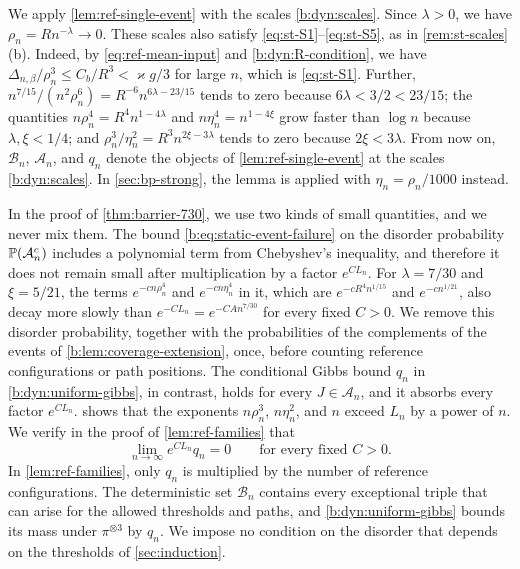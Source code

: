 We apply \cref{lem:ref-single-event} with the scales \eqref{b:dyn:scales}.
Since $\lambda>0$, we have $\rho_n=Rn^{-\lambda}\to0$. These scales also satisfy
\eqref{eq:st-S1}--\eqref{eq:st-S5}, as in
\cref{rem:st-scales}(b). Indeed, by \eqref{eq:ref-mean-input} and
\eqref{b:dyn:R-condition}, we have
$\Delta_{n,\beta}/\rho_n^3\le C_b/R^3<\varkappa g/3$ for large $n$, which is
\eqref{eq:st-S1}. Further, $n^{7/15}/(n^2\rho_n^6)=R^{-6}n^{6\lambda-23/15}$
tends to zero because $6\lambda<3/2<23/15$; the quantities
$n\rho_n^4=R^4n^{1-4\lambda}$ and $n\eta_n^4=n^{1-4\xi}$ grow faster than
$\log n$ because $\lambda,\xi<1/4$; and $\rho_n^3/\eta_n^2=R^3n^{2\xi-3\lambda}$
tends to zero because $2\xi<3\lambda$. From now on, $\mathcal B_n$,
$\mathcal A_n$, and $q_n$ denote the objects of \cref{lem:ref-single-event} at
the scales \eqref{b:dyn:scales}. In \cref{sec:bp-strong}, the lemma is
applied with $\eta_n=\rho_n/1000$ instead.

\begin{remark}\label{rem:ref-two-errors}
In the proof of \cref{thm:barrier-730}, we use two kinds of
small quantities, and we never mix them. The bound
\eqref{b:eq:static-event-failure} on the disorder probability
$\mathbb P(\mathcal A_n^c)$ includes a polynomial term from Chebyshev's inequality,
and therefore it does not remain small after multiplication by a factor
$e^{CL_n}$. For $\lambda=7/30$ and $\xi=5/21$, the terms
$e^{-cn\rho_n^4}$ and $e^{-cn\eta_n^4}$ in it, which are
$e^{-cR^4n^{1/15}}$ and $e^{-cn^{1/21}}$, also decay more slowly than
$e^{-CL_n}=e^{-CAn^{7/30}}$ for every fixed $C>0$. We remove this disorder probability,
together with the probabilities of the complements of the events of
\cref{b:lem:coverage-extension}, once, before counting reference
configurations or path positions. The conditional Gibbs bound $q_n$ in
\eqref{b:dyn:uniform-gibbs}, in contrast, holds for every
$J\in\mathcal A_n$, and it absorbs every factor
$e^{CL_n}$.  shows that the exponents
$n\rho_n^3$, $n\eta_n^2$, and $n$ exceed $L_n$ by a power of $n$. We verify
in the proof of \cref{lem:ref-families} that
\begin{equation}\label{eq:ref-absorb}
 \lim_{n\to\infty}e^{CL_n}q_n=0\qquad\text{for every fixed }C>0 .
\end{equation}
In \cref{lem:ref-families}, only $q_n$ is multiplied by the number of
reference configurations. The deterministic set $\mathcal B_n$ contains every
exceptional triple that can arise for the allowed thresholds and paths, and \eqref{b:dyn:uniform-gibbs} bounds its mass under
$\pi^{\otimes3}$ by $q_n$. We impose no condition
on the disorder that depends on the thresholds of \cref{sec:induction}.
\end{remark}

